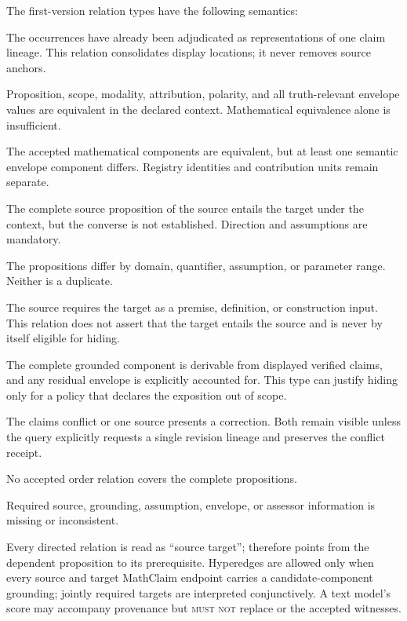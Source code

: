 The first-version relation types have the following semantics:
\begin{description}[style=nextline]
  \item[\status{same\_occurrence\_lineage}.] The occurrences have already been adjudicated as representations of one claim lineage. This relation consolidates display locations; it never removes source anchors.
  \item[\status{semantic\_equivalent}.] Proposition, scope, modality, attribution, polarity, and all truth-relevant envelope values are equivalent in the declared context. Mathematical equivalence alone is insufficient.
  \item[\status{math\_equivalent\_envelope\_distinct}.] The accepted mathematical components are equivalent, but at least one semantic envelope component differs. Registry identities and contribution units remain separate.
  \item[\status{strictly\_entails}.] The complete source proposition of the source entails the target under the context, but the converse is not established. Direction and assumptions are mandatory.
  \item[\status{specializes}/\status{generalizes}.] The propositions differ by domain, quantifier, assumption, or parameter range. Neither is a duplicate.
  \item[\status{depends\_on}.] The source requires the target as a premise, definition, or construction input. This relation does not assert that the target entails the source and is never by itself eligible for hiding.
  \item[\status{derivable\_exposition}.] The complete grounded component is derivable from displayed verified claims, and any residual envelope is explicitly accounted for. This type can justify hiding only for a policy that declares the exposition out of scope.
  \item[\status{contradicts}/\status{corrects}.] The claims conflict or one source presents a correction. Both remain visible unless the query explicitly requests a single revision lineage and preserves the conflict receipt.
  \item[\status{incomparable}.] No accepted order relation covers the complete propositions.
  \item[\status{unknown}/\status{blocked}.] Required source, grounding, assumption, envelope, or assessor information is missing or inconsistent.
\end{description}

Every directed relation is read as ``source  target'';  therefore points from the dependent proposition to its prerequisite. Hyperedges are allowed only when every source and target MathClaim endpoint carries a candidate-component grounding; jointly required targets are interpreted conjunctively. A text model's score may accompany provenance but \textsc{must not} replace  or the accepted witnesses.

